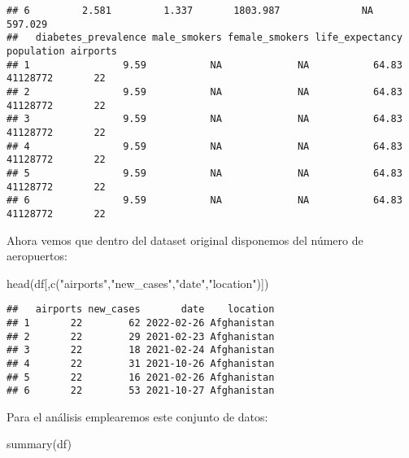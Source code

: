 \documentclass[
]{article}
\newenvironment{Shaded}{\begin{snugshade}}{\end{snugshade}}
\newcommand{\KeywordTok}[1]{\textcolor[rgb]{0.94,0.87,0.69}{#1}}
\newcommand{\NormalTok}[1]{\textcolor[rgb]{0.80,0.80,0.80}{#1}}
\newcommand{\StringTok}[1]{\textcolor[rgb]{0.80,0.58,0.58}{#1}}
\begin{document}
\begin{verbatim}
## 6         2.581         1.337       1803.987              NA               597.029
##   diabetes_prevalence male_smokers female_smokers life_expectancy population airports
## 1                9.59           NA             NA           64.83   41128772       22
## 2                9.59           NA             NA           64.83   41128772       22
## 3                9.59           NA             NA           64.83   41128772       22
## 4                9.59           NA             NA           64.83   41128772       22
## 5                9.59           NA             NA           64.83   41128772       22
## 6                9.59           NA             NA           64.83   41128772       22
\end{verbatim}

Ahora vemos que dentro del dataset original disponemos del número de
aeropuertos:

\begin{Shaded}
\begin{Highlighting}[]
\KeywordTok{head}\NormalTok{(df[,}\KeywordTok{c}\NormalTok{(}\StringTok{"airports"}\NormalTok{,}\StringTok{"new_cases"}\NormalTok{,}\StringTok{"date"}\NormalTok{,}\StringTok{"location"}\NormalTok{)])}
\end{Highlighting}
\end{Shaded}

\begin{verbatim}
##   airports new_cases       date    location
## 1       22        62 2022-02-26 Afghanistan
## 2       22        29 2021-02-23 Afghanistan
## 3       22        18 2021-02-24 Afghanistan
## 4       22        31 2021-10-26 Afghanistan
## 5       22        16 2021-02-26 Afghanistan
## 6       22        53 2021-10-27 Afghanistan
\end{verbatim}

Para el análisis emplearemos este conjunto de datos:

\begin{Shaded}
\begin{Highlighting}[]
\KeywordTok{summary}\NormalTok{(df)}
\end{Highlighting}
\end{Shaded}
\end{document}
